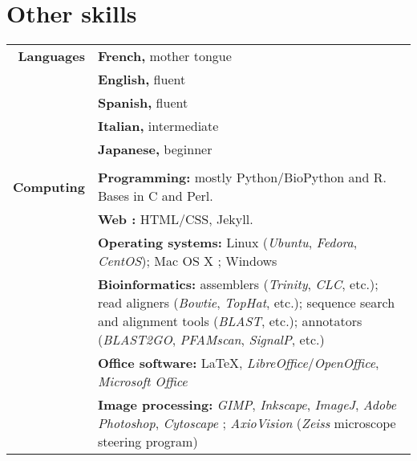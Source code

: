 \documentclass[letterpaper,10pt]{article}
\begin{document}
\section{Other skills}
\begin{tabular}{r|p{13cm}}

\textbf{Languages}
 & \textbf{French,} mother tongue \\
 & \textbf{English,} fluent \\
 & \textbf{Spanish,} fluent \\
 & \textbf{Italian,} intermediate \\
 & \textbf{Japanese,} beginner \\

\multicolumn{2}{c}{} \\

\textbf{Computing}

& \textbf{Programming:} mostly Python/BioPython and R. Bases in C and Perl.
  \vspace{2mm} \\

& \textbf{Web :} HTML/CSS, Jekyll.
  \vspace{2mm} \\

& \textbf{Operating systems:} Linux (\emph{Ubuntu}, \emph{Fedora},
  \emph{CentOS}); Mac OS X ; Windows
  \vspace{2mm} \\

& \textbf{Bioinformatics:} assemblers (\emph{Trinity}, \emph{CLC}, etc.);
  read aligners (\emph{Bowtie}, \emph{TopHat}, etc.);
  sequence search and alignment tools (\emph{BLAST}, etc.);
  annotators (\emph{BLAST2GO}, \emph{PFAMscan}, \emph{SignalP}, etc.)
  \vspace{2mm} \\

& \textbf{Office software:} \LaTeX, \emph{LibreOffice}/\emph{OpenOffice},
  \emph{Microsoft Office}
  \vspace{2mm} \\

& \textbf{Image processing:} \emph{GIMP}, \emph{Inkscape}, \emph{ImageJ},
  \emph{Adobe Photoshop}, \emph{Cytoscape} ; \emph{AxioVision} (\emph{Zeiss}
  microscope steering program) \\

\end{tabular}
\end{document}
